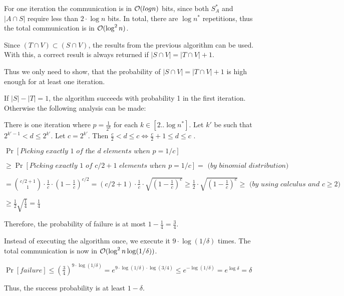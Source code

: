 For one iteration the communication is in $\mathcal{O}(log n)$ bits, since both $S_A^*$ and $|A \cap S|$ require less than $2\cdot\log n$ bits. In total, there are $\log n^*$ repetitions, thus the total communication is in $\mathcal{O}(\log^2 n)$.

Since $(T \cap V) \subset (S \cap V)$, the results from the previous algorithm can be used. With this, a correct result is always returned if $|S \cap V| = |T \cap V| + 1$.

Thus we only need to show, that the probability of $|S \cap V| = |T \cap V| + 1$ is high enough for at least one iteration.

If $|S| - |T| = 1$, the algorithm succeeds with probability 1 in the first iteration. Otherwise the following analysis can be made:

There is one iteration where $p = \frac{1}{2^k}$ for each $k \in [2..\log n^*]$. Let $k'$ be such that $2^{k' -1} < d \leq 2^{k'}$. Let $c = 2^{k'}$. Then $\frac{c}{2} < d \leq c \Leftrightarrow \frac{c}{2} + 1 \leq d \leq c$ .

$
\Pr[\textit{Picking exactly 1 of the d elements when } p = 1/c] 
$

$ \geq
\Pr[\textit{Picking exactly 1 of } c/2 + 1 \textit{ elements when } p = 1/c] = \textit{ (by binomial distribution)}
$

$ = 
{c/2 + 1 \choose 1} \cdot \frac{1}{c} \cdot \left(1 - \frac{1}{c} \right)^{c/2} = 
(c/2 + 1)  \cdot \frac{1}{c} \cdot \sqrt{\left(1 - \frac{1}{c}\right)^c} \geq
\frac{1}{2} \cdot \sqrt{\left(1 - \frac{1}{c}\right)^c} \geq \textit{ (by using calculus and } c \geq 2)
$ 

$ \geq 
\frac{1}{2} \sqrt{\frac{1}{4}} = \frac{1}{4}
$

Therefore, the probability of failure is at most $1 - \frac{1}{4} = \frac{3}{4}$.

Instead of executing the algorithm once, we execute it $9 \cdot \log (1/\delta)$ times. The total communication is now in $\mathcal{O}(\log^2 n \log (1/\delta))$.

$\Pr[\textit{failure}] \leq 
\left(\frac{3}{4}\right)^{9 \cdot \log (1/\delta)} = 
e^{9 \cdot \log (1/\delta) \cdot \log(3/4)} \leq
e^{-\log(1/\delta)} = 
e^{\log \delta} =
\delta$

Thus, the success probability is at least $1 - \delta$.

\pagebreak

